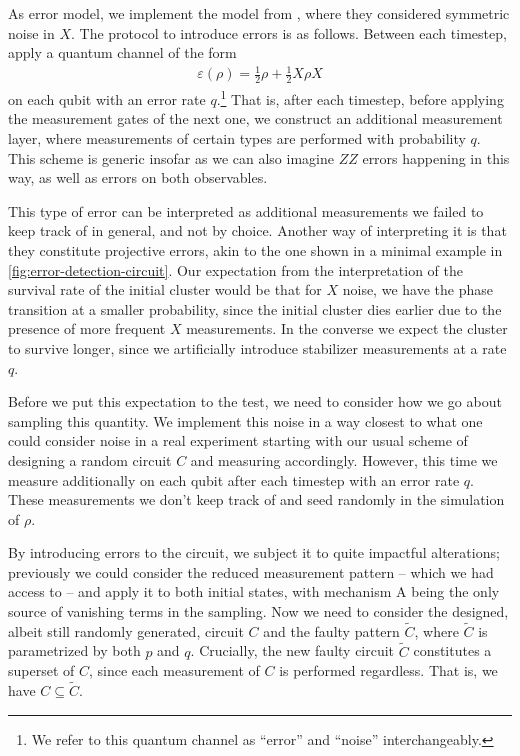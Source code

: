 As error model, we implement the model from
\cite{tikhanovskayaUniversalityCrossEntropy2023}, where they
considered symmetric noise in $X$. The protocol to introduce errors is as
follows. Between each timestep, apply a quantum channel of the form
\begin{align}\label{eq:noisechannel}
  \varepsilon(\rho) = \frac{1}{2}\rho + \frac{1}{2}X\rho X
\end{align}
on each qubit with an error rate $q$.\footnote{We refer to this quantum channel
as \enquote{error} and \enquote{noise} interchangeably.} That is, after each timestep, before
applying the measurement gates of the next one, we construct an additional
measurement layer, where measurements of certain types are performed with
probability $q$.  This scheme is generic insofar as we can also imagine $ZZ$
errors happening in this way, as well as errors on both observables.

This type of error can be interpreted as additional measurements we failed to
keep track of in general, and not by choice. Another way of interpreting it is
that they constitute projective errors, akin to the one shown in a minimal
example in \cref{fig:error-detection-circuit}. Our expectation from the
interpretation of the survival rate of the initial cluster would be that for
$X$ noise, we have the phase transition at a smaller probability, since the
initial cluster dies earlier due to the presence of more frequent $X$
measurements. In the converse we expect the cluster to survive longer, since we
artificially introduce stabilizer measurements at a rate $q$.

Before we put this expectation to the test, we need to consider how we go about
sampling this quantity. We implement this noise in a way closest to what one
could consider noise in a real experiment starting with our usual scheme of
designing a random circuit $C$ and measuring accordingly. However, this time we
measure additionally on each qubit after each timestep with an error rate $q$.
These measurements we don't keep track of and seed randomly in the simulation
of $\rho$.

By introducing errors to the circuit, we subject it to quite impactful
alterations; previously we could consider the reduced measurement
pattern -- which we had access to -- and apply it to both initial states, with
mechanism \textsf{A} being the only source of vanishing terms in the sampling.
Now we need to consider the designed, albeit still randomly generated, circuit $C$
and the faulty pattern $\tilde{C}$, where $\tilde{C}$ is parametrized by both
$p$ and $q$. Crucially, the new faulty circuit $\tilde{C}$ constitutes a
superset of $C$, since each measurement of $C$ is performed regardless. That
is, we have $C\subseteq\tilde{C}$. 

